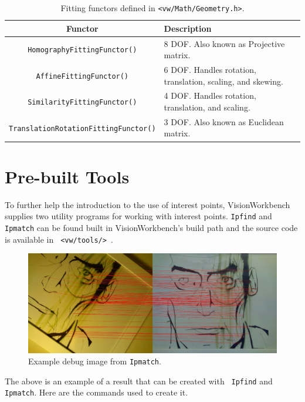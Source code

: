 \begin{table}[h]\begin{centering}
\begin{tabular}{|c|l|} \hline
Functor & Description \\ \hline \hline
\verb#HomographyFittingFunctor()# & 8 DOF. Also known as Projective matrix. \\ \hline
\verb#AffineFittingFunctor()# & 6 DOF. Handles rotation, translation, scaling, and skewing. \\ \hline
\verb#SimilarityFittingFunctor()# & 4 DOF. Handles rotation, translation, and scaling. \\ \hline
\verb#TranslationRotationFittingFunctor()# & 3 DOF. Also known as Euclidean matrix. \\ \hline
\end{tabular}
\caption{Fitting functors defined in {\tt <vw/Math/Geometry.h>}.}
\label{tbl:fitting-functors}
\end{centering}\end{table}

\section{Pre-built Tools}

To further help the introduction to the use of interest points,
VisionWorkbench supplies two utility programs for working with interest
points. {\tt Ipfind} and {\tt Ipmatch} can be found built in
VisionWorkbench's build path and the source code is available in {\tt
  <vw/tools/> }.

\begin{figure}[h]
\begin{center}
  \includegraphics[width=6in]{images/ip_demo_match.jpg}
\end{center}
\caption{Example debug image from {\tt Ipmatch}.}
\label{fig:demo}
\end{figure}

The above is an example of a result that can be created with {\tt
  Ipfind} and {\tt Ipmatch}. Here are the commands used to create it.

